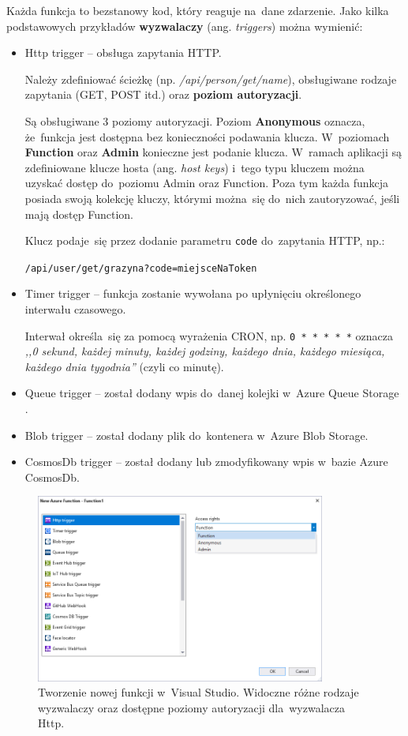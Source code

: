 \documentclass[12pt,a4paper,twoside,titlepage,openright]{book}
\begin{document}
Każda funkcja to bezstanowy kod, który reaguje na~dane zdarzenie. Jako kilka podstawowych przykładów \textbf{wyzwalaczy} (ang. \textit{triggers}) można wymienić:
\begin{itemize}
\item Http trigger -- obsługa zapytania HTTP. 

Należy zdefiniować ścieżkę (np. \textit{/api/person/get/{name}}), obsługiwane rodzaje zapytania (GET, POST itd.) oraz \textbf{poziom autoryzacji}.

Są obsługiwane 3 poziomy autoryzacji. Poziom \textbf{Anonymous} oznacza, że~funkcja jest dostępna bez konieczności podawania klucza. W~poziomach \textbf{Function} oraz \textbf{Admin} konieczne jest podanie klucza. W~ramach aplikacji są zdefiniowane klucze hosta (ang. \textit{host keys}) i~tego typu kluczem można uzyskać dostęp do~poziomu Admin oraz Function. Poza tym każda funkcja posiada swoją kolekcję kluczy, którymi można~się do~nich zautoryzować, jeśli mają dostęp Function.

Klucz podaje~się przez dodanie parametru \texttt{code} do~zapytania HTTP, np.:

\texttt{/api/user/get/grazyna?code=miejsceNaToken}
\item Timer trigger -- funkcja zostanie wywołana po upłynięciu określonego interwału czasowego. 

Interwał określa~się za pomocą wyrażenia CRON, np. \texttt{0~*~*~*~*~*} oznacza \textit{,,0 sekund, każdej minuty, każdej godziny, każdego dnia, każdego miesiąca, każdego dnia tygodnia''} (czyli co minutę). \cite{siteAppTimerTrigger}
\item Queue trigger -- został dodany wpis do~danej kolejki w~Azure Queue Storage .
\item Blob trigger -- został dodany plik do~kontenera w~Azure Blob Storage.
\item CosmosDb trigger -- został dodany lub zmodyfikowany wpis w~bazie Azure CosmosDb.
\end{itemize}


\begin{figure}[h]
	\centering
			\includegraphics[width=0.85\textwidth]{new-function.png}
		\caption{Tworzenie nowej funkcji w~Visual Studio. Widoczne różne rodzaje wyzwalaczy oraz dostępne poziomy autoryzacji dla~wyzwalacza Http.}
		\label{fig:new-function}
\end{figure}
\end{document}
